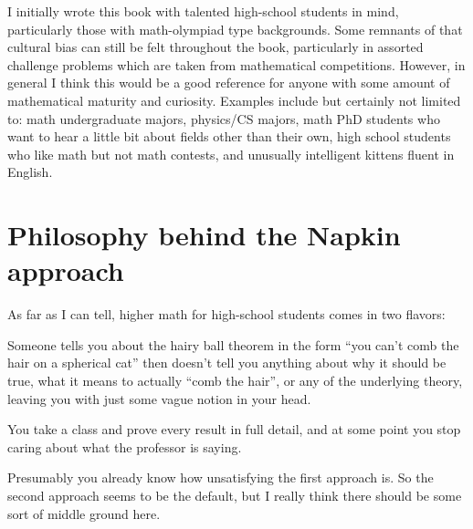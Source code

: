 I initially wrote this book with talented high-school students in mind,
particularly those with math-olympiad type backgrounds.
Some remnants of that cultural bias can still be felt throughout the book,
particularly in assorted challenge problems which are
taken from mathematical competitions.
However, in general I think this would be a good reference
for anyone with some amount of mathematical maturity and curiosity.
Examples include but certainly not limited to:
math undergraduate majors, physics/CS majors,
math PhD students who want to hear a little bit about fields other than their own,
high school students who like math but not math contests,
and unusually intelligent kittens fluent in English.

\section*{Philosophy behind the Napkin approach}
As far as I can tell, higher math for high-school students
comes in two flavors:
\begin{itemize}
	\ii Someone tells you about the hairy ball theorem in the form
	``you can't comb the hair on a spherical cat''
	then doesn't tell you anything about why it should be true,
	what it means to actually ``comb the hair'',
	or any of the underlying theory,
	leaving you with just some vague notion in your head.

	\ii You take a class and prove every result in full detail,
	and at some point you stop caring about what the professor is saying.
\end{itemize}
Presumably you already know how unsatisfying the first approach is.
So the second approach seems to be the default,
but I really think there should be some sort of middle ground here.


